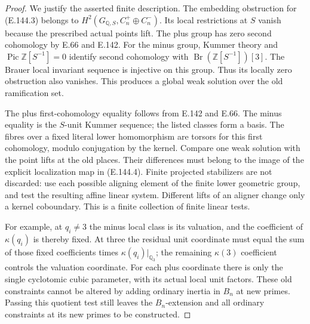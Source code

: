 \begin{proof}
We justify the asserted finite description.
The embedding obstruction for (E.144.3)
belongs to
\(H^2(G_{\mathbb Q,S},C_n^+\oplus C_n^-)\).
Its local restrictions at \(S\) vanish
because the prescribed actual points lift.
The plus group has zero second cohomology
by E.66 and E.142.
For the minus group, Kummer theory and
\(\operatorname{Pic}\mathbb Z[S^{-1}]=0\)
identify second cohomology with
\(\operatorname{Br}(\mathbb Z[S^{-1}])[3]\).
The Brauer local invariant sequence is
injective on this group. Thus its locally
zero obstruction also vanishes. This
produces a global weak solution over the
old ramification set.

The plus first-cohomology equality follows
from E.142 and E.66. The minus equality
is the \(S\)-unit Kummer sequence; the
listed classes form a basis.
The fibres over a fixed literal lower
homomorphism are torsors for this first
cohomology, modulo conjugation by the
kernel. Compare one weak solution with
the point lifts at the old places.
Their differences must belong to the
image of the explicit localization map
in (E.144.4).
Finite projected stabilizers are not
discarded: use each possible aligning
element of the finite lower geometric
group, and test the resulting affine
linear system. Different lifts of an
aligner change only a kernel coboundary.
This is a finite collection of finite
linear tests.

For example, at \(q_i\ne3\) the minus
local class is its valuation, and the
coefficient of \(\kappa(q_i)\) is thereby
fixed. At three the residual unit
coordinate must equal the sum of those
fixed coefficients times
\(\kappa(q_i)|_{\mathbb Q_3}\); the remaining
\(\kappa(3)\) coefficient controls the
valuation coordinate.
For each plus coordinate there is only
the single cyclotomic cubic parameter,
with its actual local unit factors.
These old constraints cannot be altered
by adding ordinary inertia in \(B_n\)
at new primes. Passing this quotient
test still leaves the \(B_n\)-extension
and all ordinary constraints at its
new primes to be constructed.
\end{proof}

